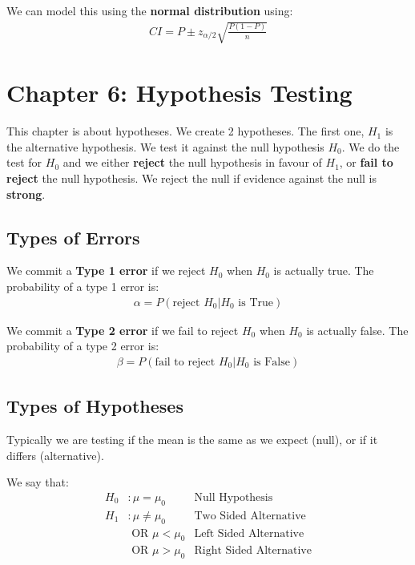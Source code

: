 \documentclass[12pt,letterpaper]{article} \usepackage{amsmath} \usepackage{graphicx} \usepackage[margin=1in]{geometry} \usepackage{longtable}  \usepackage{amssymb}
\begin{document}
	We can model this using the \textbf{normal distribution} using:
	\begin{align*}
		CI = P \pm z_{\alpha/2} \sqrt{\frac{P(1-P)}{n}}
	\end{align*}

	\section{Chapter 6: Hypothesis Testing}
	This chapter is about hypotheses. We create 2 hypotheses. The first one, $H_1$ is the alternative hypothesis. We test it against the null hypothesis $H_0$. We do the test for $H_0$ and we either \textbf{reject} the null hypothesis in favour of $H_1$, or \textbf{fail to reject} the null hypothesis. We reject the null if evidence against the null is \textbf{strong}.
	
	\subsection{Types of Errors}
	
	We commit a \textbf{Type 1 error} if we reject $H_0$ when $H_0$ is actually true. The probability of a type 1 error is:
	\begin{align*}
		\alpha = P(\text{reject }H_0 | H_0\text{ is True})
	\end{align*}
	
	We commit a \textbf{Type 2 error} if we fail to reject $H_0$ when $H_0$ is actually false. The probability of a type 2 error is:
	\begin{align*}
		\beta= P(\text{fail to reject }H_0| H_0 \text{ is False})
	\end{align*}
	
	\subsection{Types of Hypotheses}
	Typically we are testing if the mean is the same as we expect (null), or if it differs (alternative).
	
	We say that:
	\begin{align*}
		H_0&: \mu = \mu_0 &\text{Null Hypothesis}\\
		H_1&: \mu \ne \mu_0 &\text{Two Sided Alternative}\\ 
		&\text{ OR } \mu<\mu_0 &\text{Left Sided Alternative}\\
		&\text{ OR } \mu>\mu_0 &\text{Right Sided Alternative}
	\end{align*}
	
\end{document}
